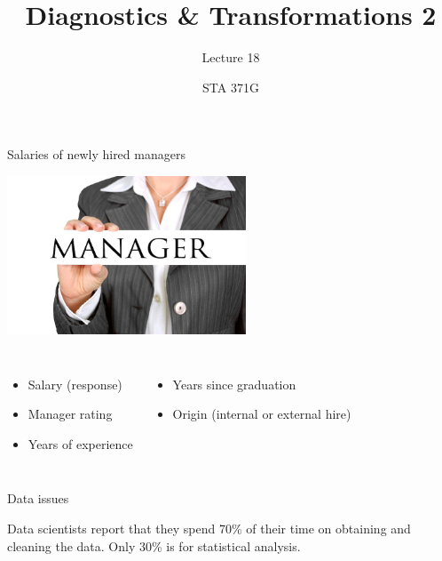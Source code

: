 \documentclass{beamer}\usepackage[]{graphicx}\usepackage[]{color}
\title{Diagnostics \& Transformations 2}
\subtitle{Lecture 18}
\author{STA 371G}
\begin{document}
  
  

  \frame{\maketitle}



  \begin{darkframes}
    \begin{frame}{Salaries of newly hired managers}
      \begin{center}
        \includegraphics[width=2.8in]{manager} \\
      \end{center} \pause
      
      \begin{columns}[onlytextwidth]
          \begin{itemize}
            \item Salary (response)
            \item Manager rating
            \item Years of experience
          \end{itemize}
          \begin{itemize}
            \item Years since graduation
            \item Origin (internal or external hire)
          \end{itemize}
      \end{columns}
    \end{frame}
   
\begin{frame}[fragile]{Data issues}
      \begin{center}
        Data scientists report that they spend \alert{70\% of their time on obtaining and cleaning the data}. Only 30\% is for statistical analysis.\bigskip \pause
        

\end{center}
\end{frame}
\end{darkframes}
\end{document}
